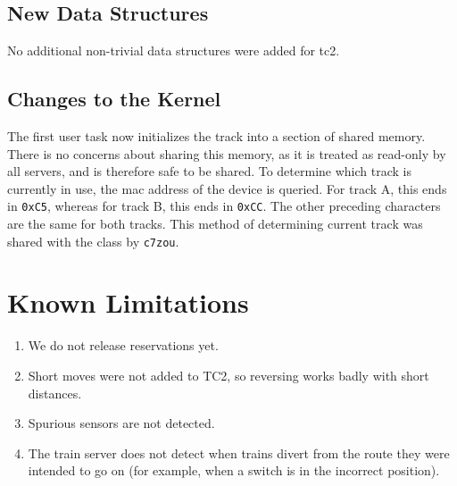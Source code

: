 \documentclass{article}
\begin{document}
\subsection{New Data Structures}
    No additional non-trivial data structures were added for tc2.
\subsection{Changes to the Kernel}
    The first user task now initializes the track into a section of shared memory. There is no concerns about sharing this memory, as it is treated as read-only by all servers, and is therefore safe to be shared. 
    To determine which track is currently in use, the mac address of the device is queried. For track A, this ends in \texttt{0xC5}, whereas for track B, this ends in \texttt{0xCC}. 
    The other preceding characters are the same for both tracks. 
    This method of determining current track was shared with the class by \verb|c7zou|.

\section{Known Limitations}
\begin{enumerate}
\item We do not release reservations yet.
\item Short moves were not added to TC2, so reversing works badly with short distances.
\item Spurious sensors are not detected.
\item The train server does not detect when trains divert from the route they were intended to go on (for example, when a switch is in the incorrect position).

\end{enumerate}
\end{document}
